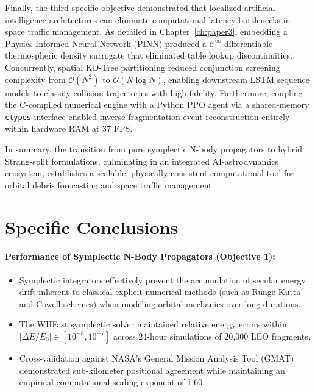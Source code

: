 \documentclass[12pt,letterpaper,twoside]{book}
\begin{document}
Finally, the third specific objective demonstrated that localized artificial intelligence architectures can eliminate computational latency bottlenecks in space traffic management. As detailed in Chapter~\ref{ch:paper3}, embedding a Physics-Informed Neural Network (PINN) produced a $\mathcal{C}^\infty$-differentiable thermospheric density surrogate that eliminated table lookup discontinuities. Concurrently, spatial KD-Tree partitioning reduced conjunction screening complexity from $\mathcal{O}(N^2)$ to $\mathcal{O}(N \log N)$, enabling downstream LSTM sequence models to classify collision trajectories with high fidelity. Furthermore, coupling the C-compiled numerical engine with a Python PPO agent via a shared-memory \texttt{ctypes} interface enabled inverse fragmentation event reconstruction entirely within hardware RAM at 37 FPS.

In summary, the transition from pure symplectic N-body propagators to hybrid Strang-split formulations, culminating in an integrated AI-astrodynamics ecosystem, establishes a scalable, physically consistent computational tool for orbital debris forecasting and space traffic management.

\section{Specific Conclusions}

\paragraph{Performance of Symplectic N-Body Propagators (Objective 1):}
\begin{itemize}
    \item Symplectic integrators effectively prevent the accumulation of secular energy drift inherent to classical explicit numerical methods (such as Runge-Kutta and Cowell schemes) when modeling orbital mechanics over long durations.
    \item The WHFast symplectic solver maintained relative energy errors within $\vert{}\Delta E/E_0\vert{} \in [10^{-8}, 10^{-7}]$ across 24-hour simulations of 20,000 LEO fragments.
    \item Cross-validation against NASA's General Mission Analysis Tool (GMAT) demonstrated sub-kilometer positional agreement while maintaining an empirical computational scaling exponent of 1.60.
\end{itemize}
\end{document}
